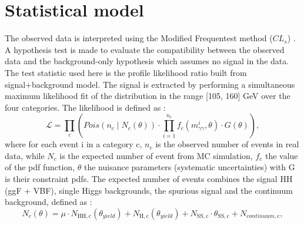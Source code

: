 \section{Statistical model}
\label{HHyybb:Stat}

The observed data is interpreted using the Modified Frequentest method ($CL_s$) \cite{CL_s}. A hypothesis test is made to evaluate the compatibility between the observed data and the background-only hypothesis which assumes no signal in the data. The test statistic used here is the profile likelihood ratio \cite{Z} built from signal+background model. The signal is extracted by performing a simultaneous maximum likelihood fit of the \myy distribution in the range [105, 160] GeV over the four categories. The likelihood is defined as : 
\begin{equation}
    \mathcal{L}=\prod_{c}\left(Pois\left(n_{c}
    \mid N_{c}(\theta)\right) \cdot \prod_{i=1}^{n_{c}}
    f_{c}\left(m_{\gamma \gamma}^{i}, \theta\right) \cdot G(\theta)\right),
\end{equation}
where for each event i in a category c, $n_c$ is the observed number of events in real data, while $N_c$ is the expected number of event from MC simulation, 
$f_c$ the value of the pdf function, $\theta$ the nuisance parameters (systematic uncertainties) with G is their constraint pdfs. 
The expected number of events combines the signal HH (ggF + VBF), single Higgs backgrounds, the spurious signal and the continuum background, defined as : 
\begin{equation}
    N_{c}(\theta)=\mu \cdot N_{\mathrm{HH},
    \mathrm{c}}\left(\theta_{yield }\right)+N_{\mathrm{H},
    \mathrm{c}}\left(\theta_{yield }\right)+N_{\mathrm{SS},
    \mathrm{c}} \cdot \theta_{\mathrm{SS},
    \mathrm{c}}+N_{continuum , \mathrm{c}},
\end{equation}

